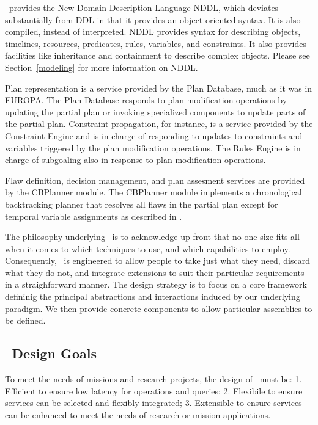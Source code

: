 \documentclass[10pt, letterpaper, twoside]{article}
\begin{document}
\ET\, provides the New Domain Description Language NDDL, which deviates
substantially from DDL in that it provides an object oriented syntax.  It
is also compiled, instead of interpreted.  NDDL provides syntax for
describing objects, timelines, resources, predicates, rules, variables, and
constraints. It also provides facilities like inheritance and containment
to describe complex objects.  Please see Section~\ref{modeling} for more
information on NDDL. 

Plan representation is a service provided by the Plan Database, much as it
was in EUROPA.  The Plan Database responds to plan modification operations
by updating the partial plan or invoking specialized components to update
parts of the partial plan.  Constraint propagation, for instance, is a
service provided by the Constraint Engine and is in charge of responding to
updates to constraints and variables triggered by the plan modification
operations. The Rules Engine is in charge of subgoaling also in response to
plan modification operations. 

Flaw definition, decision management, and plan assesment services are
provided by the CBPlanner module. The CBPlanner module implements a
chronological backtracking planner that resolves all flaws in the partial
plan except for temporal variable assignments as described in
\cite{planid,e2}. 

The philosophy underlying \ET\, is to acknowledge up front that no
one size fits all when it comes to which techniques to use, and which
capabilities to employ. Consequently, \ET\, is engineered to allow
people to take just what they need, discard what they do not, and
integrate extensions to suit their particular requirements in a
straighforward manner. The design strategy is to focus on a core
framework defininig the principal abstractions and interactions
induced by our underlying paradigm. We then provide concrete
components to allow particular assemblies to be defined. 

\subsection{\ET\, Design Goals}
\label{goals}
To meet the needs of missions and research projects, the design of 
\ET\, must be: 1. Efficient to ensure low latency for operations and
queries; 2. Flexibile to ensure services can be selected and flexibly
integrated; 3. Extensible to ensure services can be enhanced to meet the
needs of research or mission applications. 
\end{document}

